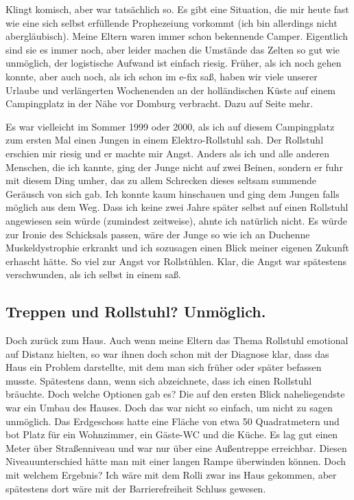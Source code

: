 \documentclass[fontsize=14pt,a4paper,headinclude,DIV=calc,automark]{scrbook}
\begin{document}
Klingt komisch, aber war tatsächlich so. Es gibt eine Situation, die mir heute fast wie eine sich selbst erfüllende Prophezeiung vorkommt (ich bin allerdings nicht abergläubisch). Meine Eltern waren immer schon bekennende Camper. Eigentlich sind sie es immer noch, aber leider machen die Umstände das Zelten so gut wie unmöglich, der logistische Aufwand ist einfach riesig. Früher, als ich noch gehen konnte, aber auch noch, als ich schon im e-fix saß, haben wir viele unserer Urlaube und verlängerten Wochenenden an der holländischen Küste auf einem Campingplatz in der Nähe vor Domburg verbracht. Dazu auf Seite \pageref{sec:zeltgemeinschaft} mehr.

Es war vielleicht im Sommer 1999 oder 2000, als ich auf diesem Campingplatz zum ersten Mal einen Jungen in einem Elektro-Rollstuhl sah. Der Rollstuhl erschien mir riesig und er machte mir Angst. Anders als ich und alle anderen Menschen, die ich kannte, ging der Junge nicht auf zwei Beinen, sondern er fuhr mit diesem Ding umher, das zu allem Schrecken dieses seltsam summende Geräusch von sich gab. Ich konnte kaum hinschauen und ging dem Jungen falls möglich aus dem Weg. Dass ich keine zwei Jahre später selbst auf einen Rollstuhl angewiesen sein würde (zumindest zeitweise), ahnte ich natürlich nicht. Es würde zur Ironie des Schicksals passen, wäre der Junge so wie ich an Duchenne Muskeldystrophie erkrankt und ich sozusagen einen Blick meiner eigenen Zukunft erhascht hätte. So viel zur Angst vor Rollstühlen. Klar, die Angst war spätestens verschwunden, als ich selbst in einem saß.

\subsection{Treppen und Rollstuhl? Unmöglich.}

Doch zurück zum Haus. Auch wenn meine Eltern das Thema Rollstuhl emotional auf Distanz hielten, so war ihnen doch schon mit der Diagnose klar, dass das Haus ein Problem darstellte, mit dem man sich früher oder später befassen musste. Spätestens dann, wenn sich abzeichnete, dass ich einen Rollstuhl bräuchte.
Doch welche Optionen gab es? Die auf den ersten Blick naheliegendste war ein Umbau des Hauses. Doch das war nicht so einfach, um nicht zu sagen unmöglich. Das Erdgeschoss hatte eine Fläche von etwa 50 Quadratmetern und bot Platz für ein Wohnzimmer, ein Gäste-WC und die Küche. Es lag gut einen Meter über Straßenniveau und war nur über eine Außentreppe erreichbar. Diesen Niveauunterschied hätte man mit einer langen Rampe überwinden können. Doch mit welchem Ergebnis? Ich wäre mit dem Rolli zwar ins Haus gekommen, aber spätestens dort wäre mit der Barrierefreiheit Schluss gewesen.
\end{document}
